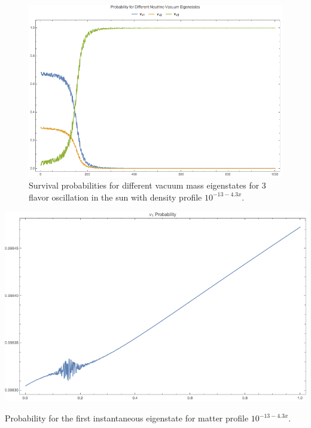 \documentclass{tufte-handout}
\begin{document}
\begin{figure}
\centering
\includegraphics{assets/numericalMSW3Flavor-vac-eigen-prob.png}
\caption{Survival probabilities for different vacuum mass eigenstates for 3 flavor oscillation in the sun with density profile $10^{-13 - 4.3 x}$.}
\label{fig:my_label}
\end{figure}


\begin{marginfigure}[10\baselineskip]
\includegraphics{assets/numericalMSW3Flavor-Inst-Eigen-prob-1.png}
\caption{Probability for the first instantaneous eigenstate for matter profile $10^{-13 - 4.3 x}$.}
\label{fig:numericalMSW3Flavor-Inst-Eigen-prob-1}
\end{marginfigure}
\end{document}
